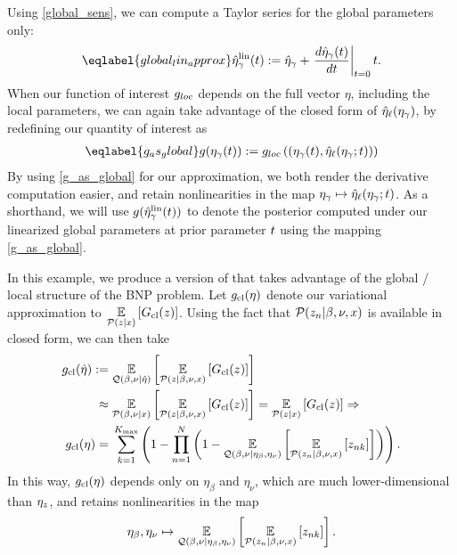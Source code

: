 Using \eqref{global_sens}, we can compute a Taylor series for the
global parameters only:
%
\begin{align}\eqlabel{global_lin_approx}
  \etalin_\gamma(\t) := \etaopt_\gamma +
  \fracat{d \etaopt_\gamma(\t)}{d \t}{\t=0} \t .
\end{align}
%
When our function of interest $g_{loc}$ depends on the full vector $\eta$,
including the local parameters, we can again take advantage of the closed form
of $\hat\eta_{\ell}(\eta_{\gamma})$, by redefining our quantity of interest as
%
\begin{align}\eqlabel{g_as_global}
\g(\etaglob(\t)) :=
    \g_{loc}\left(
        \left(\etaglob(\t), \etaoptlocal(\etaglob; \t) \right) \right)
\end{align}
%
By using \eqref{g_as_global} for our approximation, we both render the
derivative computation easier, and retain nonlinearities in the map $\eta_{\gamma}
\mapsto \hat\eta_{\ell}(\eta_{\gamma}; t)$.  As a shorthand, we will use
$g(\hat\eta^{\mathrm{lin}}_\gamma(t))$ to denote the posterior computed under our linearized
global parameters at prior parameter $t$ using the mapping \eqref{g_as_global}.


\begin{ex}
%
In this example, we produce a version of 
that takes advantage of the global / local structure of the BNP problem. Let
$g_{\text{cl}}(\eta)$ denote our variational approximation to
$\underset{\mathcal{P}(z\vert x)}{\mathbb{E}}\left[G_{\text{cl}}(z)\right]$.   Using the fact that $\mathcal{P}(z_n
\vert \beta, \nu, x)$ is available in closed form, we can then take
%
\begin{align*}
%
\gclustersabbr(\etaopt) :={}&
    \expect{\q(\beta, \nu \vert\etaopt)}{
        \expect{\p(\z \vert \beta, \nu, \x)}{\nclusters(\z)}
    }
\\\approx{}&
    \expect{\p(\beta, \nu \vert \x)}{
        \expect{\p(\z \vert \beta, \nu, \x)}{\nclusters(\z)}
    }
    = \expect{\p(\z\vert\x)}{\nclusters(\z)} \Rightarrow \\
%
\gclustersabbr(\eta) ={}&
    \sumk \left(1 -  \prod_{\n=1}^\N
        \left(1 - \expect{\q(\beta, \nu \vert \eta_\beta, \eta_\nu)}
                    {\expect{\p(\z_{\n} \vert \beta, \nu, \x)}{\z_{\n\k}}}
                    \right)\right).
%
\end{align*}
%
In this way, $g_{\text{cl}}(\eta)$ depends only on $\eta_\beta$ and $\eta_\nu$,
which are much lower-dimensional than $\eta_z$, and retains nonlinearities in
the map
%
\begin{align*}
%
\eta_\beta, \eta_\nu \mapsto \expect{\q(\beta, \nu \vert \eta_\beta,
\eta_\nu)} {\expect{\p(\z_{\n} \vert \beta, \nu, \x)}{\z_{\n\k}}}.
%
\end{align*}
%
\end{ex}

